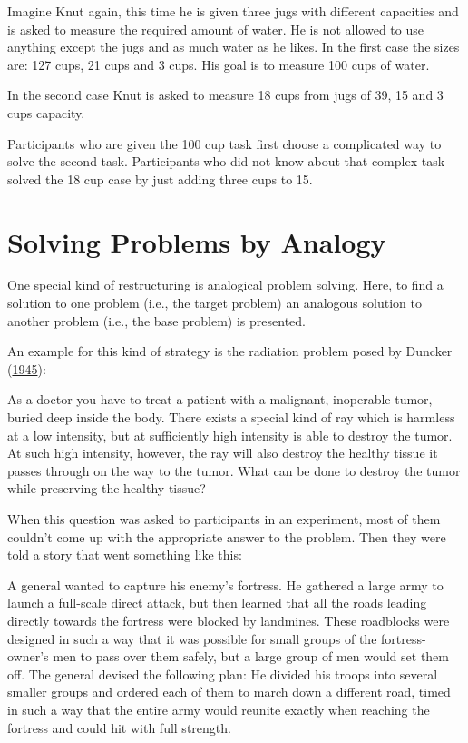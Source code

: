 \documentclass[
]{krantz}
\begin{document}
Imagine Knut again, this time he is given three jugs with different capacities and is asked to measure the required amount of water. He is not allowed to use anything except the jugs and as much water as he likes. In the first case the sizes are: 127 cups, 21 cups and 3 cups. His goal is to measure 100 cups of water.

In the second case Knut is asked to measure 18 cups from jugs of 39, 15 and 3 cups capacity.

Participants who are given the 100 cup task first choose a complicated way to solve the second task. Participants who did not know about that complex task solved the 18 cup case by just adding three cups to 15.

\hypertarget{solving-problems-by-analogy}{%
\section{Solving Problems by Analogy}\label{solving-problems-by-analogy}}

One special kind of restructuring is analogical problem solving. Here, to find a solution to one problem (i.e., the target problem) an analogous solution to another problem (i.e., the base problem) is presented.

An example for this kind of strategy is the radiation problem posed by Duncker (\protect\hyperlink{ref-duncker1945problem}{1945}):

As a doctor you have to treat a patient with a malignant, inoperable tumor, buried deep inside the body. There exists a special kind of ray which is harmless at a low intensity, but at sufficiently high intensity is able to destroy the tumor. At such high intensity, however, the ray will also destroy the healthy tissue it passes through on the way to the tumor. What can be done to destroy the tumor while preserving the healthy tissue?

When this question was asked to participants in an experiment, most of them couldn't come up with the appropriate answer to the problem. Then they were told a story that went something like this:

A general wanted to capture his enemy's fortress. He gathered a large army to launch a full-scale direct attack, but then learned that all the roads leading directly towards the fortress were blocked by landmines. These roadblocks were designed in such a way that it was possible for small groups of the fortress-owner's men to pass over them safely, but a large group of men would set them off. The general devised the following plan: He divided his troops into several smaller groups and ordered each of them to march down a different road, timed in such a way that the entire army would reunite exactly when reaching the fortress and could hit with full strength.
\end{document}
